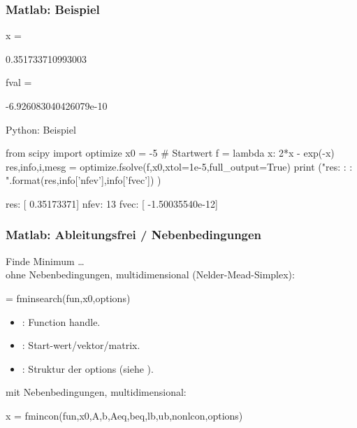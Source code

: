 \documentclass[hyperref={xetex}]{beamer}
\begin{document}
\begin{frame}[fragile]\frametitle{Matlab: Beispiel}
\begin{matlab}
x =

   0.351733710993003

fval =

    -6.926083040426079e-10
\end{matlab}

\end{frame}

\begin{frame}[fragile]{Python: Beispiel}
  \begin{pyin}
from scipy import optimize
x0 = -5  # Startwert
f = lambda x: 2*x - exp(-x)
res,info,i,mesg = optimize.fsolve(f,x0,xtol=1e-5,full_output=True) 
print ("res: {} \nnfev: {} \nfvec: {}".format(res,info['nfev'],info['fvec']) )
  \end{pyin}
  \begin{pyout}
res: [ 0.35173371]
nfev: 13 
fvec: [ -1.50035540e-12]
  \end{pyout}
\end{frame}

\begin{frame}[fragile]\frametitle{Matlab: Ableitungsfrei / Nebenbedingungen}
Finde Minimum \ldots \\

ohne Nebenbedingungen, multidimensional (Nelder-Mead-Simplex):
\begin{matlabin}
  = fminsearch(fun,x0,options)
\end{matlabin}
\begin{itemize}
 \item {}: Function handle.
\item {}: Start-wert/vektor/matrix.
\item {}: Struktur der options (siehe ).
\end{itemize}

mit Nebenbedingungen, multidimensional:
\begin{matlabin}
x = fmincon(fun,x0,A,b,Aeq,beq,lb,ub,nonlcon,options)
\end{matlabin}

\end{frame}
\end{document}
